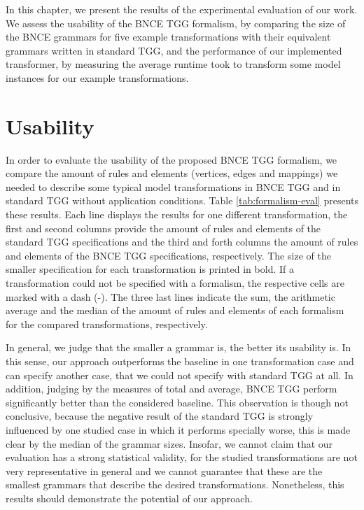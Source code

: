 In this chapter, we present the results of the experimental evaluation of our work. We assess the usability of the BNCE TGG formalism, by comparing the size of the BNCE grammars for five example transformations with their equivalent grammars written in standard TGG, and the performance of our implemented transformer, by measuring the average runtime took to transform some model instances for our example transformations.

\section{Usability}
In order to evaluate the usability of the proposed BNCE TGG formalism, we compare the amount of rules and elements (vertices, edges and mappings) we needed to describe some typical model transformations in BNCE TGG and in standard TGG without application conditions. Table \ref{tab:formalism-eval} presents these results. Each line displays the results for one different transformation, the first and second columns provide the amount of rules and elements of the standard TGG specifications and the third and forth columns the amount of rules and elements of the BNCE TGG specifications, respectively. The size of the smaller specification for each transformation is printed in bold. If a transformation could not be specified with a formalism, the respective cells are marked with a dash (-). The three last lines indicate the sum, the arithmetic average and the median of the amount of rules and elements of each formalism for the compared transformations, respectively.

In general, we judge that the smaller a grammar is, the better its usability is. In this sense, our approach outperforms the baseline in one transformation case and can specify another case, that we could not specify with standard TGG at all. In addition, judging by the measures of total and average, BNCE TGG perform significantly better than the considered baseline. This observation is though not conclusive, because the negative result of the standard TGG is strongly influenced by one studied case in which it performs specially worse, this is made clear by the median of the grammar sizes. Insofar, we cannot claim that our evaluation has a strong statistical validity, for the studied transformations are not very representative in general and we cannot guarantee that these are the smallest grammars that describe the desired transformations. Nonetheless, this results should demonstrate the potential of our approach.

